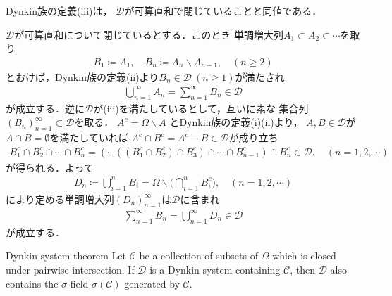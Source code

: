 \begin{screen}
	\begin{thm}
		Dynkin族の定義(iii)は，
		$\mathscr{D}$が可算直和で閉じていることと同値である．
	\end{thm}
\end{screen}

\begin{prf}
	$\mathscr{D}$が可算直和について閉じているとする．このとき
	単調増大列$A_1 \subset A_2 \subset \cdots$を取り
	\begin{align}
		B_1 \coloneqq A_1,
		\quad B_n \coloneqq A_n \backslash A_{n-1},
		\quad (n \geq 2)
	\end{align}
	とおけば，Dynkin族の定義(ii)より$B_n \in \mathscr{D}\ (n \geq 1)$が満たされ
	\begin{align}
		\bigcup_{n=1}^{\infty} A_n = \sum_{n=1}^{\infty} B_n \in \mathscr{D} 
	\end{align}
	が成立する．逆に$\mathscr{D}$が(iii)を満たしているとして，互いに素な
	集合列$(B_n)_{n=1}^{\infty} \subset \mathscr{D}$を取る．
	$A^c = \Omega \backslash A$
	とDynkin族の定義(i)(ii)より，
	$A,B \in \mathscr{D}$が$A \cap B = \emptyset$を満たしていれば
	$A^c \cap B^c = A^c - B\in \mathscr{D}$が成り立ち
	\begin{align}
		B_1^c \cap B_2^c \cap \cdots \cap B_n^c
		= \left( \cdots \left( \left( B_1^c \cap B_2^c \right) \cap B_3^c \right) \cap \cdots \cap B_{n-1}^c \right) \cap B_n^c
		\in \mathscr{D},
		\quad (n=1,2,\cdots)
	\end{align}
	が得られる．よって
	\begin{align}
		D_n \coloneqq \bigcup_{i=1}^n B_i = \Omega \backslash \Biggl( \bigcap_{i=1}^n B_i^c \Biggr),
		\quad (n=1,2,\cdots)
	\end{align}
	により定める単調増大列$(D_n)_{n=1}^{\infty}$は$\mathscr{D}$に含まれ
	\begin{align}
		\sum_{n=1}^{\infty} B_n = \bigcup_{n=1}^{\infty} D_n \in \mathscr{D}
	\end{align}
	が成立する．
	\QED
\end{prf}

\begin{itembox}[l]{Dynkin system theorem}
		Let $\mathscr{C}$ be a collection of subsets of $\Omega$ 
		which is closed under pairwise intersection. If $\mathscr{D}$ is 
		a Dynkin system containing $\mathscr{C}$, then $\mathscr{D}$ also 
		contains the $\sigma$-field $\sigma(\mathscr{C})$ generated by $\mathscr{C}$.
\end{itembox}

